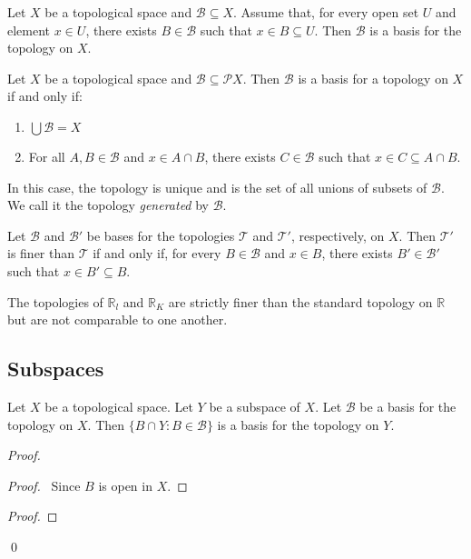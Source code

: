 \begin{prop}
Let $X$ be a topological space and $\mathcal{B} \subseteq X$. Assume that, for every open set $U$ and element $x \in U$, there exists $B \in \mathcal{B}$ such that $x \in B \subseteq U$. Then $\mathcal{B}$ is a basis for the topology on $X$.
\end{prop}

\begin{prop}
Let $X$ be a topological space and $\mathcal{B} \subseteq \mathcal{P} X$. Then $\mathcal{B}$ is a basis for a topology on $X$ if and only if:
\begin{enumerate}
\item $\bigcup \mathcal{B} = X$
\item For all $A, B \in \mathcal{B}$ and $x \in A \cap B$, there exists $C \in \mathcal{B}$ such that $x \in C \subseteq A \cap B$.
\end{enumerate}
In this case, the topology is unique and is the set of all unions of subsets of $\mathcal{B}$. We call it the topology \emph{generated} by $\mathcal{B}$.
\end{prop}

\begin{prop}
Let $\mathcal{B}$ and $\mathcal{B}'$ be bases for the topologies $\mathcal{T}$ and $\mathcal{T}'$, respectively, on $X$. Then $\mathcal{T}'$ is finer than $\mathcal{T}$ if and only if, for every $B \in \mathcal{B}$ and $x \in B$, there exists $B' \in \mathcal{B}'$ such that $x \in B' \subseteq B$.
\end{prop}

\begin{cor}
The topologies of $\mathbb{R}_l$ and $\mathbb{R}_K$ are strictly finer than the standard topology on $\mathbb{R}$ but are not comparable to one another.
\end{cor}

\subsection{Subspaces}

\begin{prop}
\label{prop:basis_subspace}
Let $X$ be a topological space. Let $Y$ be a subspace of $X$. Let $\mathcal{B}$ be a basis for the topology on $X$. Then $\{ B \cap Y : B \in \mathcal{B} \}$ is a basis for the topology on $Y$.
\end{prop}

\begin{proof}
\pf
{}
\begin{proof}
	\pf\ Since $B$ is open in $X$.
\end{proof}
\begin{proof}
\end{proof}
\qed
\end{proof}

